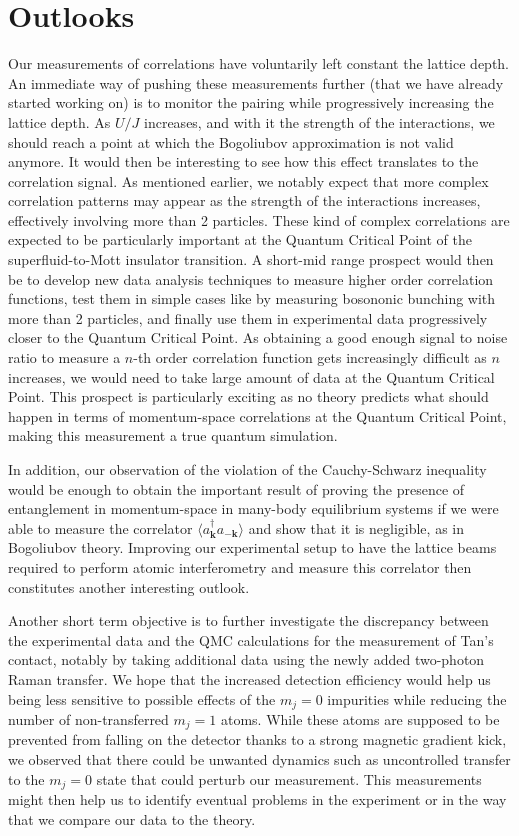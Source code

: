 \section*{Outlooks}

Our measurements of \kmk correlations have voluntarily left constant the lattice depth. An immediate way of pushing these measurements further (that we have already started working on) is to monitor the pairing while progressively increasing the lattice depth. As $U/J$ increases, and with it the strength of the interactions, we should reach a point at which the Bogoliubov approximation is not valid anymore. It would then be interesting to see how this effect translates to the \kmk correlation signal. As mentioned earlier, we notably expect that more complex correlation patterns may appear as the strength of the interactions increases, effectively involving more than 2 particles. These kind of complex correlations are expected to be particularly important at the Quantum Critical Point of the superfluid-to-Mott insulator transition. A short-mid range prospect would then be to develop new data analysis techniques to measure higher order correlation functions, test them in simple cases like by measuring bosononic bunching with more than 2 particles, and finally use them in experimental data progressively closer to the Quantum Critical Point. As obtaining a good enough signal to noise ratio to measure a $n$-th order correlation function gets increasingly difficult as $n$ increases, we would need to take large amount of data at the Quantum Critical Point. This prospect is particularly exciting as no theory predicts what should happen in terms of momentum-space correlations at the Quantum Critical Point, making this measurement a true quantum simulation. 

In addition, our observation of the violation of the Cauchy-Schwarz inequality would be enough to obtain the important result of proving the presence of entanglement in momentum-space in many-body equilibrium systems if we were able to measure the correlator  $\langle a^{\dagger}_{\bm k} a_{-\bm k} \rangle$ and show that it is negligible, as in Bogoliubov theory. Improving our experimental setup to have the lattice beams required to perform atomic interferometry and measure this correlator then constitutes another interesting outlook.

Another short term objective is to further investigate the discrepancy between the experimental data and the QMC calculations for the measurement of Tan's contact, notably by taking additional data using the newly added two-photon Raman transfer. We hope that the increased detection efficiency would help us being less sensitive to possible effects of the $m_j=0$ impurities while reducing the number of non-transferred $m_j=1$ atoms. While these atoms are supposed to be prevented from falling on the detector thanks to a strong magnetic gradient kick, we observed that there could be unwanted dynamics such as uncontrolled transfer to the $m_j=0$ state that could perturb our measurement. This measurements might then help us to identify eventual problems in the experiment or in the way that we compare our data to the theory.

